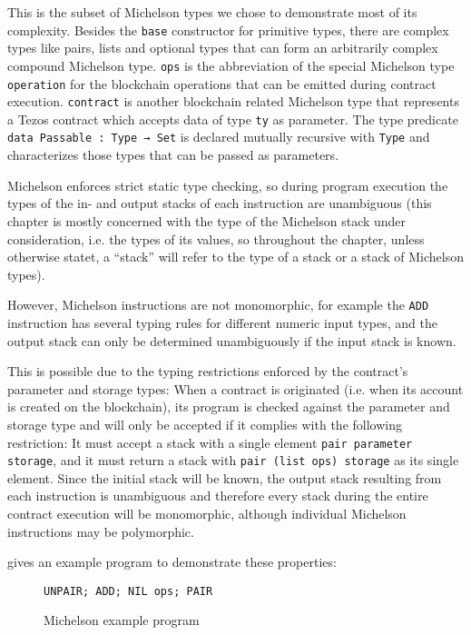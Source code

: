 This is the subset of Michelson types we chose to demonstrate most of its complexity.
Besides the \verb/base/ constructor for primitive types,
there are complex types like pairs, lists and optional types
that can form an arbitrarily complex compound Michelson type.
\verb/ops/ is the abbreviation of the special Michelson type \verb/operation/
for the blockchain operations that can be emitted during contract execution.
\verb/contract/ is another blockchain related Michelson type that represents a Tezos contract
which accepts data of type \verb/ty/ as parameter.
The type predicate \verb/data Passable : Type → Set/ is declared mutually recursive with \verb/Type/
and characterizes those types that can be passed as parameters.

Michelson enforces strict static type checking,
so during program execution the types of the in- and output stacks of each instruction
are unambiguous
(this chapter is mostly concerned with the type of the Michelson stack under consideration,
i.e. the types of its values,
so throughout the chapter, unless otherwise statet, a ``stack'' will refer to
the type of a stack or a stack of Michelson types).

However, Michelson instructions are not monomorphic, for example the \verb=ADD= instruction
has several typing rules for different numeric input types,
and the output stack can only be determined unambiguously if the input stack is known.

This is possible due to the typing restrictions enforced by the contract's parameter and storage
types:
When a contract is originated (i.e. when its account is created on the blockchain),
its program is checked against the parameter and storage type and will only be accepted
if it complies with the following restriction:
It must accept a stack with a single element \verb/pair parameter storage/,
and it must return a stack with \verb/pair (list ops) storage/ as its single element.
Since the initial stack will be known, the output stack resulting from each instruction
is unambiguous and therefore every stack during the entire contract execution will be monomorphic,
although individual Michelson instructions may be polymorphic.

 gives an example program to demonstrate these properties:
\begin{figure}[tp]
\begin{verbatim}
UNPAIR; ADD; NIL ops; PAIR
\end{verbatim}
\caption{Michelson example program}
\label{simple-example}
\end{figure}

